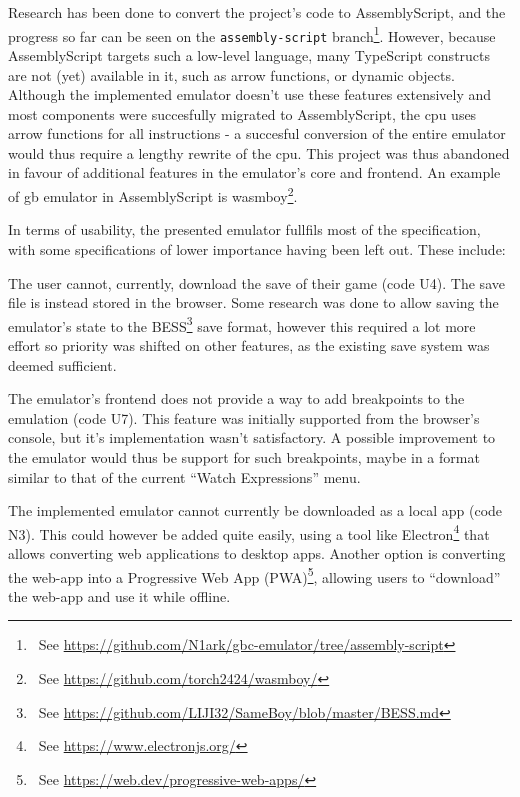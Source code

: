 \documentclass[11pt]{report}
\newcommand{\ftnt}[1]{\footnote{~See \url{#1}}}
\begin{document}
Research has been done to convert the project's code to AssemblyScript, and the progress so far can be seen on the \texttt{assembly-script} branch\ftnt{https://github.com/N1ark/gbc-emulator/tree/assembly-script}. However, because AssemblyScript targets such a low-level language, many TypeScript constructs are not (yet) available in it, such as arrow functions, or dynamic objects. Although the implemented emulator doesn't use these features extensively and most components were succesfully migrated to AssemblyScript, the \gls{cpu} uses arrow functions for all instructions - a succesful conversion of the entire emulator would thus require a lengthy rewrite of the \gls{cpu}. This project was thus abandoned in favour of additional features in the emulator's core and frontend. An example of \gls{gb} emulator in AssemblyScript is wasmboy\ftnt{https://github.com/torch2424/wasmboy/}.

In terms of usability, the presented emulator fullfils most of the specification, with some specifications of lower importance having been left out. These include:

\begin{compactitem}
	\item The user cannot, currently, download the save of their game (code U4).	 The save file is instead stored in the browser. Some research was done to allow saving the emulator's state to the BESS\ftnt{https://github.com/LIJI32/SameBoy/blob/master/BESS.md} save format, however this required a lot more effort so priority was shifted on other features, as the existing save system was deemed sufficient.
	\item The emulator's frontend does not provide a way to add breakpoints to the emulation (code U7). This feature was initially supported from the browser's console, but it's implementation wasn't satisfactory. A possible improvement to the emulator would thus be support for such breakpoints, maybe in a format similar to that of the current ``Watch Expressions'' menu.
	\item The implemented emulator cannot currently be downloaded as a local app (code N3). This could however be added quite easily, using a tool like Electron\ftnt{https://www.electronjs.org/} that allows converting web applications to desktop apps. Another option is converting the web-app into a Progressive Web App (PWA)\ftnt{https://web.dev/progressive-web-apps/}, allowing users to ``download'' the web-app and use it while offline.
\end{compactitem}
\end{document}
